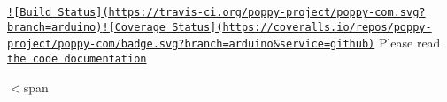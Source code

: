 \href{https://travis-ci.org/poppy-project/poppy-com}{\tt !\mbox{[}Build Status\mbox{]}(https\-://travis-\/ci.\-org/poppy-\/project/poppy-\/com.\-svg?branch=arduino)}\href{https://coveralls.io/github/poppy-project/poppy-com?branch=arduino}{\tt !\mbox{[}Coverage Status\mbox{]}(https\-://coveralls.\-io/repos/poppy-\/project/poppy-\/com/badge.\-svg?branch=arduino\&service=github)} Please read \href{http://poppy-project.github.io/poppy-com/}{\tt the code documentation}

$<$span 